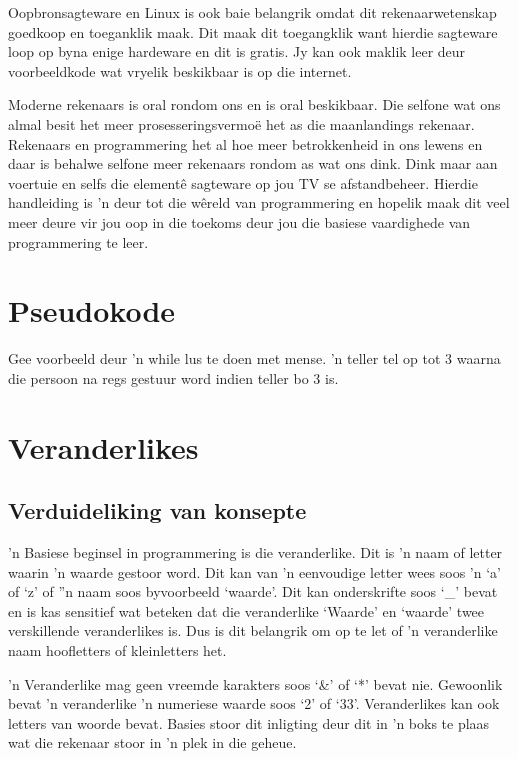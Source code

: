 Oopbronsagteware en Linux is ook baie belangrik omdat dit rekenaarwetenskap goedkoop en toeganklik maak.  Dit maak dit toegangklik want hierdie sagteware loop op byna enige hardeware en dit is gratis.  Jy kan ook maklik leer deur voorbeeldkode wat vryelik beskikbaar is op die internet.

Moderne rekenaars is oral rondom ons en is oral beskikbaar.  Die selfone wat ons almal besit het meer prosesseringsvermo\"e het as die maanlandings rekenaar.  Rekenaars en programmering het al hoe meer betrokkenheid in ons lewens en daar is behalwe selfone meer rekenaars rondom as wat ons dink.  Dink maar aan voertuie en selfs die element\^e sagteware op jou TV se afstandbeheer.  Hierdie handleiding is 'n deur tot die w\^ereld van programmering en hopelik maak dit veel meer deure vir jou oop in die toekoms deur jou die basiese vaardighede van programmering te leer.




\chapter[Pseudokode]
{Pseudokode}
  

Gee voorbeeld deur 'n while lus te doen met mense. 'n teller tel op tot 3 waarna die persoon na regs gestuur word indien teller bo 3 is.

\chapter[Veranderlikes]
{Veranderlikes}

\section{Verduideliking van konsepte}

'n Basiese beginsel in programmering is die veranderlike.  Dit is 'n naam of letter waarin 'n waarde gestoor word.  Dit kan van 'n eenvoudige letter wees soos 'n `a' of `z' of ''n naam soos byvoorbeeld `waarde'.  Dit kan onderskrifte soos `\_' bevat en is kas sensitief wat beteken dat die veranderlike `Waarde' en `waarde' twee verskillende veranderlikes is.  Dus is dit belangrik om op te let of 'n veranderlike naam hoofletters of kleinletters het.

'n Veranderlike mag geen vreemde karakters soos `\&' of `*' bevat nie.  Gewoonlik bevat 'n veranderlike 'n numeriese waarde soos `2' of `33'.  Veranderlikes kan ook letters van woorde bevat.  Basies stoor dit inligting deur dit in 'n boks te plaas wat die rekenaar stoor in 'n plek in die geheue. 

